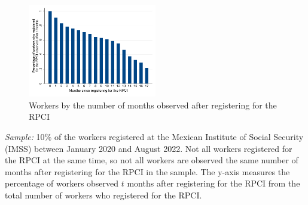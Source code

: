 \documentclass[oneside,11pt]{article}
\begin{document}
\clearpage

\begin{figure}[H]
    \caption{Workers by the number of months observed after registering for the RPCI}
    \label{hist_time_since_treated}
    \begin{center}
    \includegraphics[width=0.5\textwidth]{04_Figures/muestra_10porciento/hist_time_since_treated.pdf}
    \end{center}
\end{figure}
\scriptsize{
\noindent \textit{Sample:} 10\% of the workers registered at the Mexican Institute of Social Security (IMSS) between January 2020 and August 2022. Not all workers registered for the RPCI at the same time, so not all workers are observed the same number of months after registering for the RPCI in the sample. The y-axis measures the percentage of workers observed $t$ months after registering for the RPCI from the total number of workers who registered for the RPCI.
}

\clearpage
\end{document}
